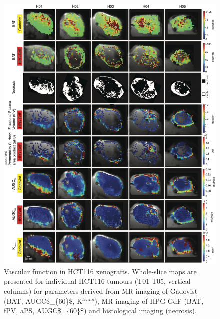 \begin{figure}[htbp]
 \begin{center}
 \includegraphics[width=\textwidth]{hpg/hpg-paper1-images/hpg_fig7-hct116.png}
 \caption{Vascular function in HCT116 xenografts. Whole-slice maps are presented for individual HCT116 tumours (T01-T05, vertical columns) for parameters derived from MR imaging of Gadovist (BAT, \acs{AUGC$_{60}$}, K$^{trans}$), MR imaging of \acs{HPG-GdF} (\acs{BAT}, \acs{fPV}, \acs{aPS}, \acs{AUGC$_{60}$}) and histological imaging (necrosis).}
 \label{hpgpaper1:fig7}
 \end{center}
\end{figure}

